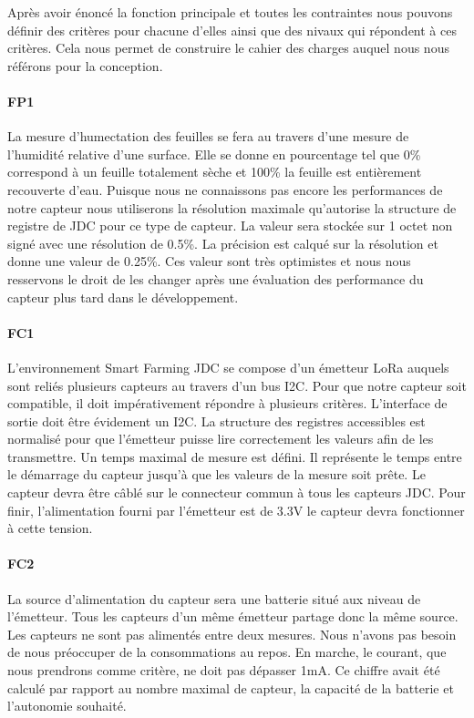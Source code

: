 Après avoir énoncé la fonction principale et toutes les contraintes nous pouvons définir des critères pour chacune d'elles ainsi que des nivaux qui répondent à ces critères. Cela nous permet de construire le cahier des charges auquel nous nous référons pour la conception. 

\paragraph{FP1}
La mesure d'humectation des feuilles se fera au travers d'une mesure de l'humidité relative d'une surface. Elle se donne en pourcentage tel que 0\% correspond à un feuille totalement sèche et 100\% la feuille est entièrement recouverte d'eau. Puisque nous ne connaissons pas encore les performances de notre capteur nous utiliserons la résolution maximale qu'autorise la structure de registre de JDC pour ce type de capteur. La valeur sera stockée sur 1 octet non signé avec une résolution de 0.5\%. La précision est calqué sur la résolution et donne une valeur de 0.25\%. Ces valeur sont très optimistes et nous nous resservons le droit de les changer après une évaluation des performance du capteur plus tard dans le développement. 

\paragraph{FC1} \label{fc1}
L’environnement Smart Farming JDC se compose d'un émetteur LoRa auquels sont reliés plusieurs capteurs au travers d'un bus I2C. Pour que notre capteur soit compatible, il doit impérativement répondre à plusieurs critères. L'interface de sortie doit être évidement un I2C. La structure des registres accessibles est normalisé pour que l’émetteur puisse lire correctement les valeurs afin de les transmettre. Un temps maximal de mesure est défini. Il représente le temps entre le démarrage du capteur jusqu'à que les valeurs de la mesure soit prête. Le capteur devra être câblé sur le connecteur commun à tous les capteurs JDC. Pour finir, l'alimentation fourni par l'émetteur est de 3.3V le capteur devra fonctionner à cette tension.

\paragraph{FC2}
La source d'alimentation du capteur sera une batterie situé aux niveau de l'émetteur. Tous les capteurs d'un même émetteur partage donc la même source. Les capteurs ne sont pas alimentés entre deux mesures. Nous n'avons pas besoin de nous préoccuper de la consommations au repos. En marche, le courant, que nous prendrons comme critère, ne doit pas dépasser 1mA. Ce chiffre avait été calculé par rapport au nombre maximal de capteur, la capacité de la batterie et l'autonomie souhaité.  


